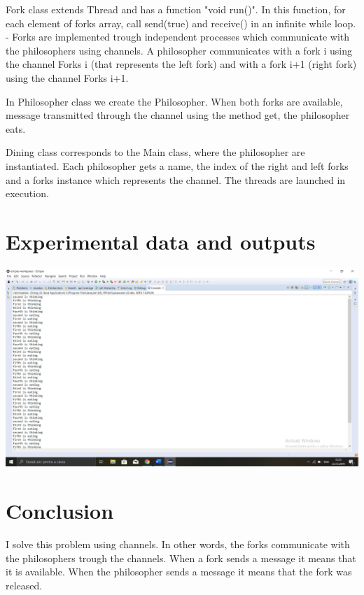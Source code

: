 \documentclass{article}
\begin{document}
\hspace{0.5 cm}
Fork class extends Thread and has a function "void run()". In this function, for each element of forks array, call send(true) and receive() in an infinite while loop. -	Forks are implemented trough independent processes which communicate with the philosophers using channels. A philosopher communicates with a fork i using the channel Forks i (that represents the left fork) and with a fork i+1 (right fork) using the channel Forks i+1.

\hspace{0.5 cm}
 In Philosopher class we create the Philosopher. When both forks are 	available, message transmitted through the channel using the method get, 	the philosopher eats.
 
 \hspace{0.5 cm}
 Dining class corresponds to the Main class, where the philosopher are instantiated. Each philosopher gets a name, the index of the right and left forks and a forks instance which represents the channel. The threads are 	launched in execution.
 
\section{Experimental data and outputs}
\hspace{0.5 cm}

\includegraphics{Channels.png}

 
\section{Conclusion}
\hspace{0.5 cm} 
I solve this problem using channels. In other words, the forks communicate with the philosophers trough the channels. When a fork sends a message it means that it is available. When the philosopher sends a message it means that the fork was released. 
\end{document}
